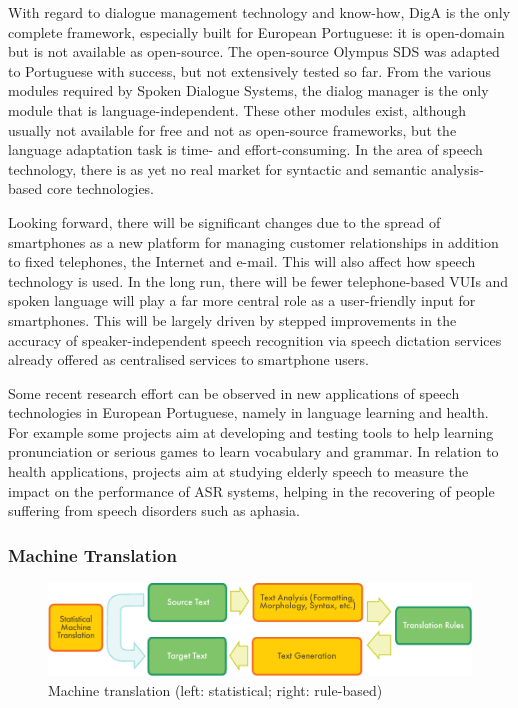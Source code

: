 \begin{multicols}{2}
    With regard to dialogue management technology and know-how, DigA is the only complete framework, especially built for European Portuguese: it is open-domain but is not available as open-source. The open-source Olympus SDS was adapted to Portuguese with success, but not extensively tested so far. From the various modules required by Spoken Dialogue Systems, the dialog manager is the only module that is language-independent. These other modules exist, although usually not available for free and not as open-source frameworks, but the language adaptation task is time- and effort-consuming. In the area of speech technology, there is as yet no real market for syntactic and semantic analysis-based core technologies.

   Looking forward, there will be significant changes due to the spread of smartphones as a new platform for managing customer relationships in addition to fixed telephones, the Internet and e-mail. This will also affect how speech technology is used. In the long run, there will be fewer telephone-based VUIs and spoken language will play a far more central role as a user-friendly input for smartphones. This will be largely driven by stepped improvements in the accuracy of speaker-independent speech recognition via speech dictation services already offered as centralised services to smartphone users. 

Some recent research effort can be observed in new applications of speech technologies in European Portuguese, namely in language learning and health. For example some projects aim at developing and testing tools to help learning pronunciation or serious games to learn vocabulary and grammar. In relation to health applications, projects aim at studying elderly speech to measure the impact on the performance of ASR systems, helping in the recovering of people suffering from speech disorders such as aphasia.

\subsubsection{Machine Translation}

\begin{figure}[htb]
  \center
  \includegraphics[width=\textwidth]{../_media/english/machine_translation}
  \caption{Machine translation (left: statistical; right: rule-based)}
  \label{fig:mtarch_en}
\end{figure}


\end{multicols}

